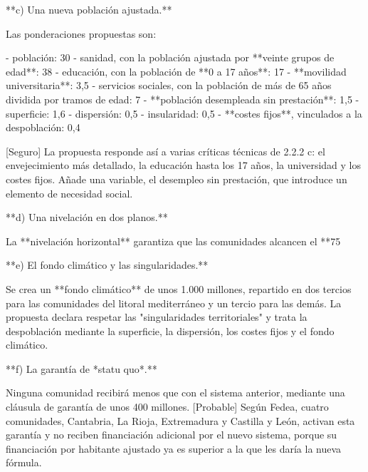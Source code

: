 \documentclass[10pt,a4paper]{article}
\begin{document}
**c) Una nueva población ajustada.**

Las ponderaciones propuestas son:

- población: 30%
- sanidad, con la población ajustada por **veinte grupos de edad**: 38%
- educación, con la población de **0 a 17 años**: 17%
- **movilidad universitaria**: 3,5%
- servicios sociales, con la población de más de 65 años dividida por tramos de edad: 7%
- **población desempleada sin prestación**: 1,5%
- superficie: 1,6%
- dispersión: 0,5%
- insularidad: 0,5%
- **costes fijos**, vinculados a la despoblación: 0,4%

[Seguro] La propuesta responde así a varias críticas técnicas de 2.2.2 c: el envejecimiento más detallado, la educación hasta los 17 años, la universidad y los costes fijos. Añade una variable, el desempleo sin prestación, que introduce un elemento de necesidad social.

**d) Una nivelación en dos planos.**

La **nivelación horizontal** garantiza que las comunidades alcancen el **75%

**e) El fondo climático y las singularidades.**

Se crea un **fondo climático** de unos 1.000 millones, repartido en dos tercios para las comunidades del litoral mediterráneo y un tercio para las demás. La propuesta declara respetar las "singularidades territoriales" y trata la despoblación mediante la superficie, la dispersión, los costes fijos y el fondo climático.

**f) La garantía de *statu quo*.**

Ninguna comunidad recibirá menos que con el sistema anterior, mediante una cláusula de garantía de unos 400 millones. [Probable] Según Fedea, cuatro comunidades, Cantabria, La Rioja, Extremadura y Castilla y León, activan esta garantía y no reciben financiación adicional por el nuevo sistema, porque su financiación por habitante ajustado ya es superior a la que les daría la nueva fórmula.
\end{document}
